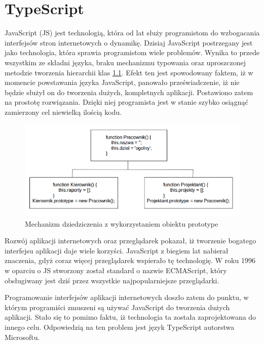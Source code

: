 \chapter{TypeScript}
JavaScript (JS) jest technologią, która od lat służy programistom do wzbogacania interfejsów stron internetowych o dynamikę\cite{javascript-book}. Dzisiaj JavaScript postrzegany jest jako technologia, która sprawia programistom wiele problemów. Wynika to przede wszystkim ze składni języka, braku mechanizmu typowania oraz uproszczonej metodzie tworzenia hierarchii klas \ref{fig:javascript-inheritance}. Efekt ten jest spowodowany faktem, iż w momencie powstawania języka JavaScript, panowało przeświadczenie, iż nie będzie służył on do tworzenia dużych, kompletnych aplikacji. Postawiono zatem na prostotę rozwiązania. Dzięki niej programista jest w stanie szybko osiągnąć zamierzony cel niewielką ilością kodu.

\begin{figure}[h]
	\includegraphics[width=140mm]{./img/javascript-inheritance.png}
	\caption{Mechanizm dziedziczenia z wykorzystaniem obiektu prototype}
	\label{fig:javascript-inheritance}
\end{figure}

Rozwój aplikacji internetowych oraz przeglądarek pokazał, iż tworzenie bogatego interfejsu aplikacji daje wiele korzyści. JavaScript z biegiem lat nabierał znaczenia, gdyż coraz więcej przeglądarek wspierało tę technologię. W roku 1996 w oparciu o JS stworzony został standard o nazwie ECMAScript, który obsługiwany jest dziś przez wszystkie najpopularniejsze przeglądarki. 

Programowanie interfejsów aplikacji internetowych doszło zatem do punktu, w którym programiści zmuszeni są używać JavaScript do tworzenia dużych aplikacji\cite{javascript-book}. Stało się to pomimo faktu, iż technologia ta została zaprojektowana do innego celu. Odpowiedzią na ten problem jest język TypeScript autorstwa Microsoftu.

